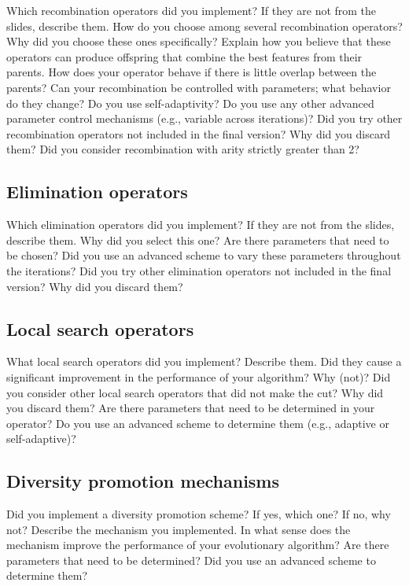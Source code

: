 \documentclass[a4paper,10pt]{article}
\newcommand{\ReplaceMe}[1]{{\color{blue}#1}}
\begin{document}
\ReplaceMe{Which recombination operators did you implement? If they are not from the slides, describe them. How do you choose among several recombination operators? Why did you choose these ones specifically? Explain how you believe that these operators can produce offspring that combine the best features from their parents. How does your operator behave if there is little overlap between the parents? Can your recombination be controlled with parameters; what behavior do they change? Do you use self-adaptivity? Do you use any other advanced parameter control mechanisms (e.g., variable across iterations)? Did you try other recombination operators not included in the final version? Why did you discard them? Did you consider recombination with arity strictly greater than 2?}

\subsection{Elimination operators}

\ReplaceMe{Which elimination operators did you implement? If they are not from the slides, describe them. Why did you select this one? Are there parameters that need to be chosen? Did you use an advanced scheme to vary these parameters throughout the iterations? Did you try other elimination operators not included in the final version? Why did you discard them?} 

\subsection{Local search operators}

\ReplaceMe{What local search operators did you implement? Describe them. Did they cause a significant improvement in the performance of your algorithm? Why (not)? Did you consider other local search operators that did not make the cut? Why did you discard them? Are there parameters that need to be determined in your operator? Do you use an advanced scheme to determine them (e.g., adaptive or self-adaptive)?}

\subsection{Diversity promotion mechanisms}

\ReplaceMe{Did you implement a diversity promotion scheme? If yes, which one? If no, why not? Describe the mechanism you implemented. In what sense does the mechanism improve the performance of your evolutionary algorithm? Are there parameters that need to be determined? Did you use an advanced scheme to determine them?}
\end{document}
